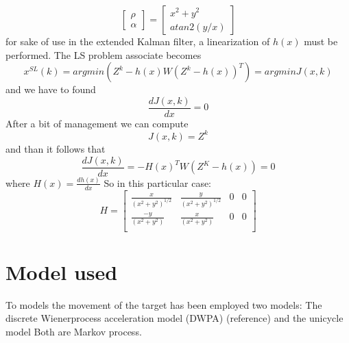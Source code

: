 \documentclass[twocolumn]{article}
\begin{document}
    \begin{equation*}
        \begin{bmatrix}
            \rho\\ \alpha
        \end{bmatrix}=  
        \begin{bmatrix}
            x^2+y^2\\ atan2(y/x)
        \end{bmatrix} 
    \end{equation*}
   for sake of use in the extended Kalman filter, a linearization of $h(x)$ must be performed.
   The LS problem associate becomes
   \begin{equation*}
       x^{SL}(k)=arg min(Z^{k}-h(x)W(Z^{k}-h(x))^{T})= argmin J(x,k)
   \end{equation*}
   and we have to found 
   \begin{equation*}
     \frac{dJ(x,k)}{dx}=0
\end{equation*}
After a bit of management we can compute 
\begin{equation*}
    J(x,k)=Z^{k}
\end{equation*}
        and than it follows that
        \begin{equation*}
            \frac{dJ(x,k)}{dx}=-H(x)^{T}W(Z^{K}-h(x))=0
        \end{equation*}
        where $H(x)=\frac{dh(x)}{dx}$ So in this particular case:
    \begin{equation}
        H= \begin{bmatrix}
            \frac{x}{(x^{2}+y^{2})^{1/2}} & \frac{y}{(x^{2}+y^{2})^{1/2}}& 0& 0 \\
            \frac{-y}{(x^{2}+y^{2})}  & \frac{x}{(x^{2}+y^{2})}& 0& 0 \\
        \end{bmatrix}
    \end{equation}
    \section*{Model used}
    To models the movement of the target has been employed two models: The discrete Wienerprocess acceleration model (DWPA) (reference) and the unicycle model
    Both are Markov process.
\end{document}

